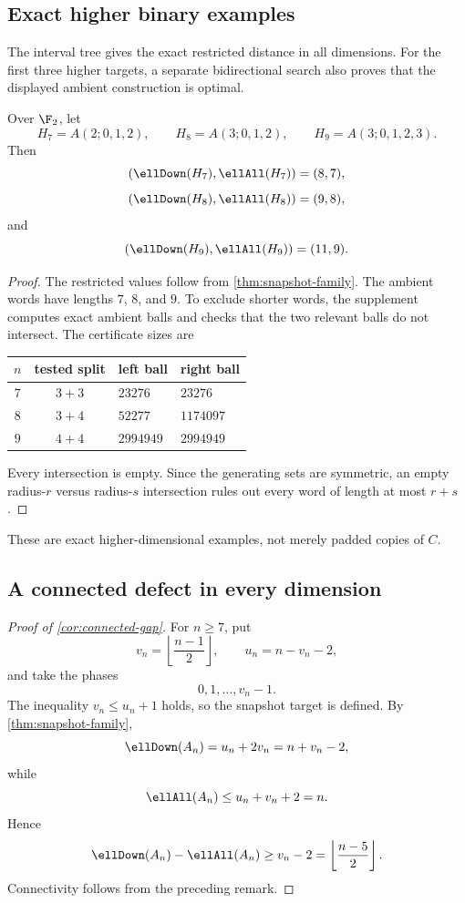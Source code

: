 \subsection{Exact higher binary examples}

The interval tree gives the exact restricted distance in all dimensions.  For the first three higher targets, a separate bidirectional search also proves that the displayed ambient construction is optimal.

\begin{theorem}\label{thm:higher-exact}
Over $\F_2$, let
\[
H_7=A(2;0,1,2),
\qquad
H_8=A(3;0,1,2),
\qquad
H_9=A(3;0,1,2,3).
\]
Then
\[
(\ellDown(H_7),\ellAll(H_7))=(8,7),
\]
\[
(\ellDown(H_8),\ellAll(H_8))=(9,8),
\]
and
\[
(\ellDown(H_9),\ellAll(H_9))=(11,9).
\]
\end{theorem}

\begin{proof}
The restricted values follow from \cref{thm:snapshot-family}.  The ambient words have lengths $7$, $8$, and $9$.  To exclude shorter words, the supplement computes exact ambient balls and checks that the two relevant balls do not intersect.  The certificate sizes are
\begin{center}
\begin{tabular}{@{}ccll@{}}
\toprule
$n$&tested split&left ball&right ball\\
\midrule
$7$&$3+3$&$23276$&$23276$\\
$8$&$3+4$&$52277$&$1174097$\\
$9$&$4+4$&$2994949$&$2994949$\\
\bottomrule
\end{tabular}
\end{center}
Every intersection is empty.  Since the generating sets are symmetric, an empty radius-$r$ versus radius-$s$ intersection rules out every word of length at most $r+s$.
\end{proof}

These are exact higher-dimensional examples, not merely padded copies of $C$.

\subsection{A connected defect in every dimension}

\begin{proof}[Proof of \cref{cor:connected-gap}]
For $n\ge7$, put
\[
v_n=\left\lfloor\frac{n-1}{2}\right\rfloor,
\qquad
u_n=n-v_n-2,
\]
and take the phases
\[
0,1,\ldots,v_n-1.
\]
The inequality $v_n\le u_n+1$ holds, so the snapshot target is defined.  By \cref{thm:snapshot-family},
\[
\ellDown(A_n)=u_n+2v_n=n+v_n-2,
\]
while
\[
\ellAll(A_n)\le u_n+v_n+2=n.
\]
Hence
\[
\ellDown(A_n)-\ellAll(A_n)
\ge v_n-2
=
\left\lfloor\frac{n-5}{2}\right\rfloor.
\]
Connectivity follows from the preceding remark.
\end{proof}

